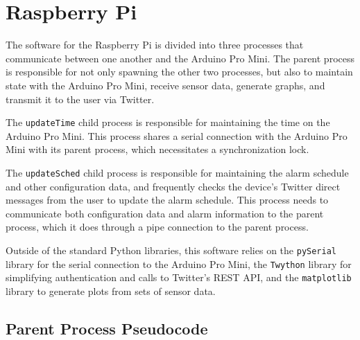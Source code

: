 \section{Raspberry Pi}
The software for the Raspberry Pi is divided into three processes that
communicate between one another and the Arduino Pro Mini. The parent
process is responsible for not only spawning the other two processes,
but also to maintain state with the Arduino Pro Mini, receive sensor
data, generate graphs, and transmit it to the user via Twitter.

The \texttt{updateTime} child process is responsible for maintaining
the time on the Arduino Pro Mini. This process shares a serial
connection with the Arduino Pro Mini with its parent process, which
necessitates a synchronization lock.

The \texttt{updateSched} child process is responsible for maintaining
the alarm schedule and other configuration data, and frequently checks
the device's Twitter direct messages from the user to update the alarm
schedule. This process needs to communicate both configuration data
and alarm information to the parent process, which it does through a
pipe connection to the parent process.

Outside of the standard Python libraries, this software relies on the
\verb|pySerial| library for the serial connection to the Arduino Pro
Mini, the \verb|Twython| library for simplifying authentication and
calls to Twitter's REST API, and the \verb|matplotlib| library to
generate plots from sets of sensor data.

\subsection{Parent Process Pseudocode}
\begin{verbatim}

\end{verbatim}
